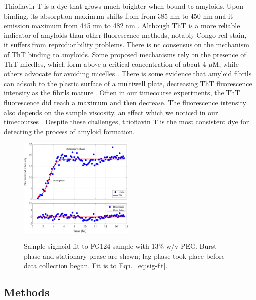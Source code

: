 Thioflavin T is a dye that grows much brighter when bound to amyloids.  Upon binding, its absorption maximum shifts from from 385 nm to 450 nm and it emission maximum from 445 nm to 482 nm \cite{picken12}.  Although ThT is a more reliable indicator of amyloids than other fluorescence methods, notably Congo red stain, it suffers from reproducibility problems.  There is no consensus on the mechanism of ThT binding to amyloids.  Some proposed mechanisms rely on the presence of ThT micelles, which form above a critical concentration of about 4 $\mu$M, while others advocate for avoiding micelles \cite{khurana05, groenning09}.  There is some evidence that amyloid fibrils can adsorb to the plastic surface of a multiwell plate, decreasing ThT fluorescence intensity as the fibrils mature \cite{murray13}.  Often in our timecourse experiments, the ThT fluorescence did reach a maximum and then decrease.  The fluorescence intensity also depends on the sample viscosity, an effect which we noticed in our timecourses \cite{}.  Despite these challenges, thioflavin T is the most consistent dye for detecting the process of amyloid formation.

\begin{figure}
\caption{Sample sigmoid fit to FG124 sample with 13\% w/v PEG.  Burst phase and stationary phase are shown; lag phase took place before data collection began.  Fit is to Eqn.~\ref{eq:sig-fit}.\\}
\centering
\includegraphics[width=0.5\textwidth]{figs/ch05/sample-sigmoid}
\label{fig:sigmoid-fit}
\end{figure}

\subsection{Methods}

